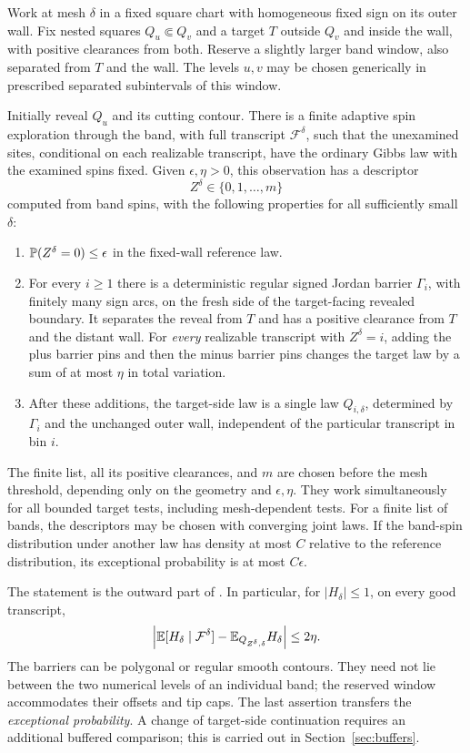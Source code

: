 \begin{theorem}\label{in:transfer}
Work at mesh $\delta$ in a fixed square chart with homogeneous fixed
sign on its outer wall. Fix nested squares $Q_u\Subset Q_v$ and a
target $T$ outside $Q_v$ and inside the wall, with positive clearances
from both. Reserve a slightly larger band window, also separated from
$T$ and the wall. The levels $u,v$ may be chosen generically in
prescribed separated subintervals of this window.

Initially reveal $Q_u$ and its cutting contour. There is a finite
adaptive spin exploration through the band, with full transcript
$\mathcal F^\delta$, such that the unexamined sites, conditional on
each realizable transcript, have the ordinary Gibbs law with the
examined spins fixed. Given $\epsilon,\eta>0$, this observation has a
descriptor
\[
 Z^\delta\in\{0,1,\ldots,m\}
\]
computed from band spins, with the following properties for all
sufficiently small $\delta$:
\begin{enumerate}
\item $\mathbb P(Z^\delta=0)\leq\epsilon$ in the fixed-wall reference law.
\item For every $i\geq1$ there is a deterministic regular signed
Jordan barrier $\Gamma_i$, with finitely many sign arcs, on the fresh
side of the target-facing revealed boundary. It separates the reveal
from $T$ and has a positive clearance from $T$ and the distant wall.
For \emph{every} realizable transcript with $Z^\delta=i$, adding the
plus barrier pins and then the minus barrier pins changes the target
law by a sum of at most $\eta$ in total variation.
\item After these additions, the target-side law is a single law
$Q_{i,\delta}$, determined by $\Gamma_i$ and the unchanged outer
wall, independent of the particular transcript in bin $i$.
\end{enumerate}
The finite list, all its positive clearances, and $m$ are chosen
before the mesh threshold, depending only on the geometry and
$\epsilon,\eta$. They work simultaneously for all bounded target
tests, including mesh-dependent tests. For a finite list of bands,
the descriptors may be chosen with converging joint laws.
If the band-spin distribution under another law has density at most
$C$ relative to the reference distribution, its exceptional
probability is at most $C\epsilon$.
\end{theorem}

The statement is the outward part of
\cite[Theorem~9.1 and Lemma~7.2]{IsingToolkit}. In particular, for
$|H_\delta|\leq1$, on every good transcript,
\begin{equation}\label{in:lookup}
 \left|\mathbb E[H_\delta\mid\mathcal F^\delta]
        -\mathbb E_{Q_{Z^\delta,\delta}}H_\delta\right|\leq2\eta.
\end{equation}
The barriers can be polygonal or regular smooth contours. They need
not lie between the two numerical levels of an individual band;
the reserved window accommodates their offsets and tip caps.
The last assertion transfers the \emph{exceptional probability}.
A change of target-side continuation requires an additional buffered
comparison; this is carried out in Section~\ref{sec:buffers}.

